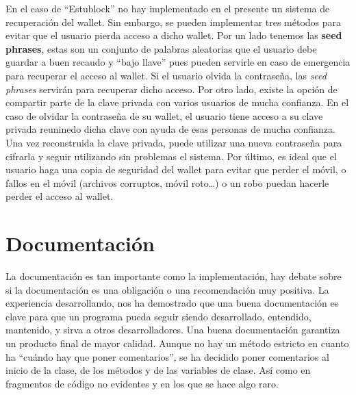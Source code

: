 En el caso de ``Estublock'' no hay implementado en el presente un sistema de recuperación del wallet. Sin embargo, se pueden implementar tres métodos para evitar que el usuario pierda acceso a dicho wallet. Por un lado tenemos las \textbf{seed phrases}, estas son un conjunto de palabras aleatorias que el usuario debe guardar a buen recaudo y ``bajo llave'' pues pueden servirle en caso de emergencia para recuperar el acceso al wallet. Si el usuario olvida la contraseña, las \emph{seed phrases} servirán para recuperar dicho acceso. Por otro lado, existe la opción de compartir parte de la clave privada con varios usuarios de mucha confianza. En el caso de olvidar la contraseña de su wallet, el usuario tiene acceso a su clave privada reuninedo dicha clave con ayuda de esas personas de mucha confianza. Una vez reconstruida la clave privada, puede utilizar una nueva contraseña para cifrarla y seguir utilizando sin problemas el sistema. Por último, es ideal que el usuario haga una copia de seguridad del wallet para evitar que perder el móvil, o fallos en el móvil (archivos corruptos, móvil roto\dots) o un robo puedan hacerle perder el acceso al wallet. 

\section{Documentación}

La documentación es tan importante como la implementación, hay debate sobre si la documentación es una obligación o una recomendación muy positiva. La experiencia desarrollando, nos ha demostrado que una buena documentación es clave para que un programa pueda seguir siendo desarrollado, entendido, mantenido, y sirva a otros desarrolladores. Una buena documentación garantiza un producto final de mayor calidad. Aunque no hay un método estricto en cuanto ha ``cuándo hay que poner comentarios'', se ha decidido poner comentarios al inicio de la clase, de los métodos y de las variables de clase. Así como en fragmentos de código no evidentes y en los que se hace algo raro. \\

